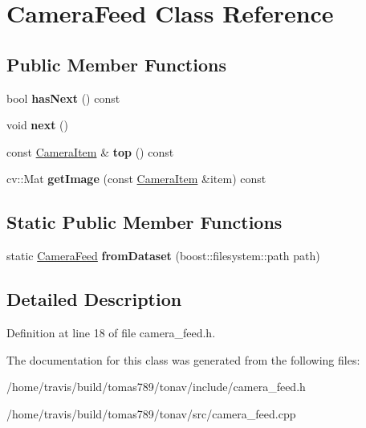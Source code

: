 \hypertarget{class_camera_feed}{\section{Camera\-Feed Class Reference}
\label{class_camera_feed}
}
\subsection*{Public Member Functions}
\begin{DoxyCompactItemize}
\item 
\hypertarget{class_camera_feed_a2d7c8c329802b64568b312675115efce}{bool {\bfseries has\-Next} () const }\label{class_camera_feed_a2d7c8c329802b64568b312675115efce}

\item 
\hypertarget{class_camera_feed_a175a707efb56c2f3c78c2859129cbc24}{void {\bfseries next} ()}\label{class_camera_feed_a175a707efb56c2f3c78c2859129cbc24}

\item 
\hypertarget{class_camera_feed_ac703c1de71a7bf488f82921177ea4b0a}{const \hyperlink{class_camera_item}{Camera\-Item} \& {\bfseries top} () const }\label{class_camera_feed_ac703c1de71a7bf488f82921177ea4b0a}

\item 
\hypertarget{class_camera_feed_af761420a0337f52253b23c7d276516f8}{cv\-::\-Mat {\bfseries get\-Image} (const \hyperlink{class_camera_item}{Camera\-Item} \&item) const }\label{class_camera_feed_af761420a0337f52253b23c7d276516f8}

\end{DoxyCompactItemize}
\subsection*{Static Public Member Functions}
\begin{DoxyCompactItemize}
\item 
\hypertarget{class_camera_feed_a38c0ad4632b39babdc99fc65ddc56c36}{static \hyperlink{class_camera_feed}{Camera\-Feed} {\bfseries from\-Dataset} (boost\-::filesystem\-::path path)}\label{class_camera_feed_a38c0ad4632b39babdc99fc65ddc56c36}

\end{DoxyCompactItemize}


\subsection{Detailed Description}


Definition at line 18 of file camera\-\_\-feed.\-h.



The documentation for this class was generated from the following files\-:\begin{DoxyCompactItemize}
\item 
/home/travis/build/tomas789/tonav/include/camera\-\_\-feed.\-h\item 
/home/travis/build/tomas789/tonav/src/camera\-\_\-feed.\-cpp\end{DoxyCompactItemize}
